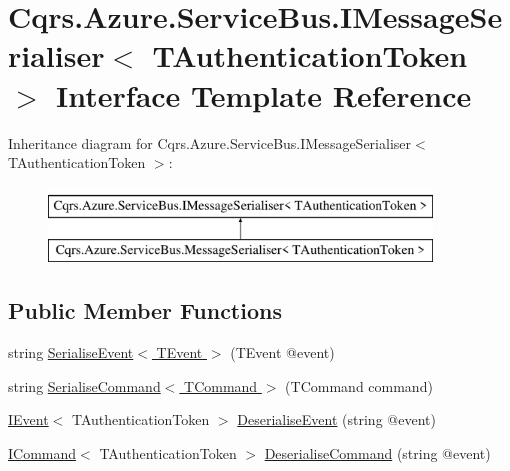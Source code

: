 \hypertarget{interfaceCqrs_1_1Azure_1_1ServiceBus_1_1IMessageSerialiser}{}\section{Cqrs.\+Azure.\+Service\+Bus.\+I\+Message\+Serialiser$<$ T\+Authentication\+Token $>$ Interface Template Reference}
\label{interfaceCqrs_1_1Azure_1_1ServiceBus_1_1IMessageSerialiser}
Inheritance diagram for Cqrs.\+Azure.\+Service\+Bus.\+I\+Message\+Serialiser$<$ T\+Authentication\+Token $>$\+:\begin{figure}[H]
\begin{center}
\leavevmode
\includegraphics[height=2.000000cm]{interfaceCqrs_1_1Azure_1_1ServiceBus_1_1IMessageSerialiser}
\end{center}
\end{figure}
\subsection*{Public Member Functions}
\begin{DoxyCompactItemize}
\item 
string \hyperlink{interfaceCqrs_1_1Azure_1_1ServiceBus_1_1IMessageSerialiser_af6e1bca15164a08308969794b089c31b_af6e1bca15164a08308969794b089c31b}{Serialise\+Event$<$ T\+Event $>$} (T\+Event @event)
\item 
string \hyperlink{interfaceCqrs_1_1Azure_1_1ServiceBus_1_1IMessageSerialiser_a7454ac36eca3dd37d0c596e0406b4c81_a7454ac36eca3dd37d0c596e0406b4c81}{Serialise\+Command$<$ T\+Command $>$} (T\+Command command)
\item 
\hyperlink{interfaceCqrs_1_1Events_1_1IEvent}{I\+Event}$<$ T\+Authentication\+Token $>$ \hyperlink{interfaceCqrs_1_1Azure_1_1ServiceBus_1_1IMessageSerialiser_ab65c6e4a8c2a660ceb2236ee11fd33f6_ab65c6e4a8c2a660ceb2236ee11fd33f6}{Deserialise\+Event} (string @event)
\item 
\hyperlink{interfaceCqrs_1_1Commands_1_1ICommand}{I\+Command}$<$ T\+Authentication\+Token $>$ \hyperlink{interfaceCqrs_1_1Azure_1_1ServiceBus_1_1IMessageSerialiser_aade6efce33aae849c4c6ed1e24211ecc_aade6efce33aae849c4c6ed1e24211ecc}{Deserialise\+Command} (string @event)
\end{DoxyCompactItemize}


